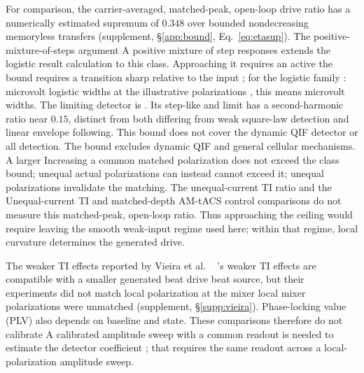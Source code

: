 \documentclass[11pt,a4paper]{article}
\providecommand{\DIFaddtex}[1]{{\protect\color{blue} \sf #1}} %
\providecommand{\DIFdeltex}[1]{{\protect\color{red} \scriptsize #1}} %
\providecommand{\DIFaddbegin}{} %
\providecommand{\DIFaddend}{} %
\providecommand{\DIFdelbegin}{} %
\providecommand{\DIFdelend}{} %
\providecommand{\DIFadd}[1]{\texorpdfstring{\DIFaddtex{#1}}{#1}} %
\providecommand{\DIFdel}[1]{\texorpdfstring{\DIFdeltex{#1}}{}} %
\begin{document}
For comparison, the carrier-averaged, matched-peak, open-loop \DIFdelbegin \DIFdel{drive }\DIFdelend ratio has a
numerically estimated supremum of $0.348$ over bounded nondecreasing memoryless
transfers (supplement, \S\ref{app:bound}, Eq.~\eqref{eq:etasup}). \DIFdelbegin \DIFdel{The positive-mixture-of-steps argument }\DIFdelend \DIFaddbegin \DIFadd{A positive
mixture of step responses }\DIFaddend extends the logistic \DIFdelbegin \DIFdel{result }\DIFdelend \DIFaddbegin \DIFadd{calculation }\DIFaddend to this class.
Approaching \DIFdelbegin \DIFdel{it requires an active }\DIFdelend \DIFaddbegin \DIFadd{the bound requires a }\DIFaddend transition sharp relative to the input\DIFdelbegin \DIFdel{; for the logistic family }\DIFdelend \DIFaddbegin \DIFadd{:
microvolt logistic widths }\DIFaddend at the illustrative polarizations\DIFdelbegin \DIFdel{, this means microvolt widths. The limiting detector is }\DIFdelend \DIFaddbegin \DIFadd{. Its }\DIFaddend step-like
\DIFdelbegin \DIFdel{and }\DIFdelend \DIFaddbegin \DIFadd{limit }\DIFaddend has a second-harmonic ratio near $0.15$, \DIFdelbegin \DIFdel{distinct from both }\DIFdelend \DIFaddbegin \DIFadd{differing from }\DIFaddend weak square-law
\DIFdelbegin \DIFdel{detection }\DIFdelend and linear envelope \DIFdelbegin \DIFdel{following. This bound does not cover
the dynamic QIF detector or all }\DIFdelend \DIFaddbegin \DIFadd{detection. The bound excludes dynamic QIF and general
}\DIFaddend cellular mechanisms. \DIFdelbegin \DIFdel{A larger }\DIFdelend \DIFaddbegin \DIFadd{Increasing a }\DIFaddend common matched polarization \DIFdelbegin \DIFdel{does not exceed
the class bound; unequal actual polarizations can
instead }\DIFdelend \DIFaddbegin \DIFadd{cannot exceed
it; unequal polarizations }\DIFaddend invalidate the matching. \DIFdelbegin \DIFdel{The unequal-current TI ratio and
the }\DIFdelend \DIFaddbegin \DIFadd{Unequal-current TI and
}\DIFaddend matched-depth AM-tACS \DIFdelbegin \DIFdel{control }\DIFdelend \DIFaddbegin \DIFadd{comparisons }\DIFaddend do not measure this \DIFdelbegin \DIFdel{matched-peak, }\DIFdelend open-loop ratio.
\DIFdelbegin \DIFdel{Thus approaching the ceiling would require leaving the smooth weak-input regime
used here; within that regime, local curvature determines the generated drive.
}\DIFdelend

\DIFdelbegin \DIFdel{The weaker TI effects reported by }\DIFdelend Vieira et al.\DIFdelbegin \DIFdel{\ }\DIFdelend \DIFaddbegin \DIFadd{'s weaker TI effects }\DIFaddend \cite{vieira2024} are compatible with a
smaller \DIFdelbegin \DIFdel{generated beat drive}\DIFdelend \DIFaddbegin \DIFadd{beat source}\DIFaddend , but their \DIFdelbegin \DIFdel{experiments did not match local polarization at the mixer }\DIFdelend \DIFaddbegin \DIFadd{local mixer polarizations were unmatched
}\DIFaddend (supplement, \S\ref{supp:vieira}). Phase-locking value (PLV) also depends on
baseline and state. \DIFdelbegin \DIFdel{These comparisons
therefore do not calibrate }\DIFdelend \DIFaddbegin \DIFadd{A calibrated amplitude sweep with a common readout is
needed to estimate }\DIFaddend the detector coefficient\DIFdelbegin \DIFdel{; that requires the same
readout across a local-polarization amplitude sweep}\DIFdelend .
\end{document}
